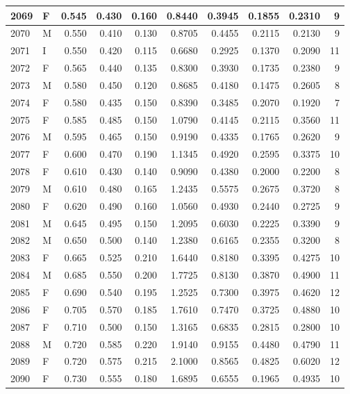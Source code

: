 \documentclass[9pt,twocolumn,twoside,]{pnas-new}
\begin{document}
\begin{tabular}{l|l|r|r|r|r|r|r|r|r}
\hline
2069 & F & 0.545 & 0.430 & 0.160 & 0.8440 & 0.3945 & 0.1855 & 0.2310 & 9\\
\hline
2070 & M & 0.550 & 0.410 & 0.130 & 0.8705 & 0.4455 & 0.2115 & 0.2130 & 9\\
\hline
2071 & I & 0.550 & 0.420 & 0.115 & 0.6680 & 0.2925 & 0.1370 & 0.2090 & 11\\
\hline
2072 & F & 0.565 & 0.440 & 0.135 & 0.8300 & 0.3930 & 0.1735 & 0.2380 & 9\\
\hline
2073 & M & 0.580 & 0.450 & 0.120 & 0.8685 & 0.4180 & 0.1475 & 0.2605 & 8\\
\hline
2074 & F & 0.580 & 0.435 & 0.150 & 0.8390 & 0.3485 & 0.2070 & 0.1920 & 7\\
\hline
2075 & F & 0.585 & 0.485 & 0.150 & 1.0790 & 0.4145 & 0.2115 & 0.3560 & 11\\
\hline
2076 & M & 0.595 & 0.465 & 0.150 & 0.9190 & 0.4335 & 0.1765 & 0.2620 & 9\\
\hline
2077 & F & 0.600 & 0.470 & 0.190 & 1.1345 & 0.4920 & 0.2595 & 0.3375 & 10\\
\hline
2078 & F & 0.610 & 0.430 & 0.140 & 0.9090 & 0.4380 & 0.2000 & 0.2200 & 8\\
\hline
2079 & M & 0.610 & 0.480 & 0.165 & 1.2435 & 0.5575 & 0.2675 & 0.3720 & 8\\
\hline
2080 & F & 0.620 & 0.490 & 0.160 & 1.0560 & 0.4930 & 0.2440 & 0.2725 & 9\\
\hline
2081 & M & 0.645 & 0.495 & 0.150 & 1.2095 & 0.6030 & 0.2225 & 0.3390 & 9\\
\hline
2082 & M & 0.650 & 0.500 & 0.140 & 1.2380 & 0.6165 & 0.2355 & 0.3200 & 8\\
\hline
2083 & F & 0.665 & 0.525 & 0.210 & 1.6440 & 0.8180 & 0.3395 & 0.4275 & 10\\
\hline
2084 & M & 0.685 & 0.550 & 0.200 & 1.7725 & 0.8130 & 0.3870 & 0.4900 & 11\\
\hline
2085 & F & 0.690 & 0.540 & 0.195 & 1.2525 & 0.7300 & 0.3975 & 0.4620 & 12\\
\hline
2086 & F & 0.705 & 0.570 & 0.185 & 1.7610 & 0.7470 & 0.3725 & 0.4880 & 10\\
\hline
2087 & F & 0.710 & 0.500 & 0.150 & 1.3165 & 0.6835 & 0.2815 & 0.2800 & 10\\
\hline
2088 & M & 0.720 & 0.585 & 0.220 & 1.9140 & 0.9155 & 0.4480 & 0.4790 & 11\\
\hline
2089 & F & 0.720 & 0.575 & 0.215 & 2.1000 & 0.8565 & 0.4825 & 0.6020 & 12\\
\hline
2090 & F & 0.730 & 0.555 & 0.180 & 1.6895 & 0.6555 & 0.1965 & 0.4935 & 10\\

\end{tabular}
\end{document}
